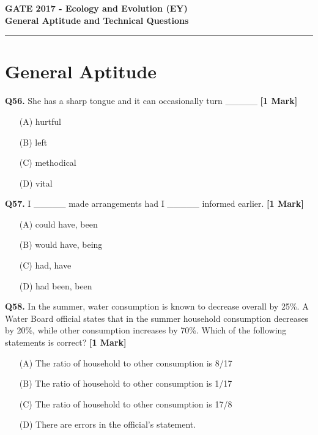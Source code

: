\documentclass[11pt]{article}
\newcommand{\questiona}[2]{
    \noindent\textbf{Q#2.} #1 \hfill \textbf{[1 Mark]}
}
\begin{document}
\begin{center}
    \Large\textbf{GATE 2017 - Ecology and Evolution (EY)} \\
    \large\textbf{General Aptitude and Technical Questions} \\
    \rule{\textwidth}{0.5pt} %
\end{center}

\vspace{0.5cm}

\section*{General Aptitude}

\questiona{She has a sharp tongue and it can occasionally turn \_\_\_\_\_}{56}
\begin{enumerate}
    \item[(A)] hurtful  
    \item[(B)] left  
    \item[(C)] methodical  
    \item[(D)] vital  
\end{enumerate}
\vspace{0.5cm}

\questiona{I \_\_\_\_\_ made arrangements had I \_\_\_\_\_ informed earlier.}{57}
\begin{enumerate}
    \item[(A)] could have, been  
    \item[(B)] would have, being  
    \item[(C)] had, have  
    \item[(D)] had been, been  
\end{enumerate}
\vspace{0.5cm}

\questiona{In the summer, water consumption is known to decrease overall by 25\%. A Water Board official states that in the summer household consumption decreases by 20\%, while other consumption increases by 70\%. Which of the following statements is correct?}{58}
\begin{enumerate}
    \item[(A)] The ratio of household to other consumption is 8/17  
    \item[(B)] The ratio of household to other consumption is 1/17  
    \item[(C)] The ratio of household to other consumption is 17/8  
    \item[(D)] There are errors in the official's statement.  
\end{enumerate}
\vspace{0.5cm}
\end{document}
